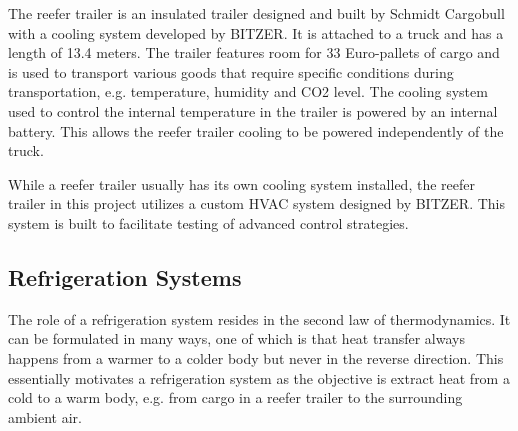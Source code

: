 The reefer trailer is an insulated trailer designed and built by Schmidt Cargobull with a cooling system developed by BITZER. It is attached to a truck and has a length of 13.4 meters. The trailer features room for 33 Euro-pallets of cargo and is used to transport various goods that require specific  conditions during transportation, e.g. temperature, humidity and CO2 level. The cooling system used to control the internal temperature in the trailer is powered by an internal battery. This allows the reefer trailer cooling to be powered independently of the truck.

While a reefer trailer usually has its own cooling system installed, the reefer trailer in this project utilizes a custom HVAC system designed by BITZER. This system is built to facilitate testing of advanced control strategies.

\subsection{Refrigeration Systems}
The role of a refrigeration system resides in the second law of thermodynamics. It can be formulated in many ways, one of which is that heat transfer always happens from a warmer to a colder body but never in the reverse direction. This essentially motivates a refrigeration system as the objective is extract heat from a cold to a warm body, e.g. from cargo in a reefer trailer to the surrounding ambient air.

